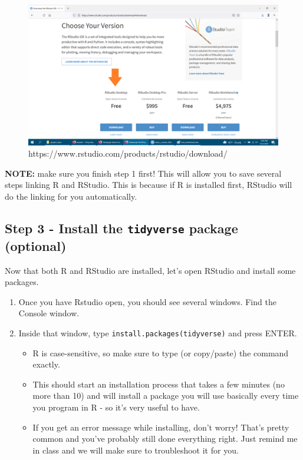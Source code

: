 \documentclass[
]{book}
\providecommand{\tightlist}{%
  \setlength{\itemsep}{0pt}\setlength{\parskip}{0pt}}
\begin{document}
\begin{figure}

{\centering \includegraphics[width=0.8\linewidth]{images/rstudio_download_instruction} 

}

\caption{https://www.rstudio.com/products/rstudio/download/}\label{fig:unnamed-chunk-3}
\end{figure}

\textbf{NOTE:} make sure you finish step 1 first! This will allow you to save several steps linking R and RStudio. This is because if R is installed first, RStudio will do the linking for you automatically.

\hypertarget{step-3---install-the-tidyverse-package-optional}{%
\subsection{\texorpdfstring{Step 3 - Install the \texttt{tidyverse} package (optional)}{Step 3 - Install the tidyverse package (optional)}}\label{step-3---install-the-tidyverse-package-optional}}

Now that both R and RStudio are installed, let's open RStudio and install some packages.

\begin{enumerate}
\def\labelenumi{\arabic{enumi}.}
\item
  Once you have Rstudio open, you should see several windows. Find the Console window.
\item
  Inside that window, type \texttt{install.packages(\textquotesingle{}tidyverse\textquotesingle{})} and press ENTER.

  \begin{itemize}
  \tightlist
  \item
    R is case-sensitive, so make sure to type (or copy/paste) the command exactly.
  \item
    This should start an installation process that takes a few minutes (no more than 10) and will install a package you will use basically every time you program in R - so it's very useful to have.
  \item
    If you get an error message while installing, don't worry! That's pretty common and you've probably still done everything right. Just remind me in class and we will make sure to troubleshoot it for you.
  \end{itemize}
\end{enumerate}
\end{document}
